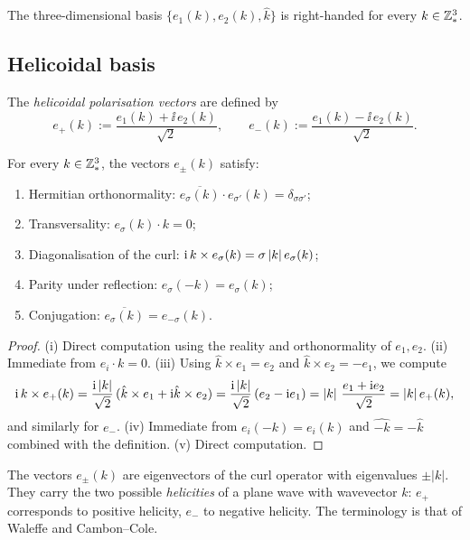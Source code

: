 The three-dimensional basis $\{e_1(k), e_2(k), \hat k\}$ is 
right-handed for every $k\in\mathbb{Z}^3_\ast$.

\subsection{Helicoidal basis}
\label{part-1:ssec:helical}

The \emph{helicoidal polarisation vectors} are defined by
\begin{equation}\label{part-1:eq:helicoidal}
e_+(k) := \frac{e_1(k) + \ii\, e_2(k)}{\sqrt 2},
\qquad
e_-(k) := \frac{e_1(k) - \ii\, e_2(k)}{\sqrt 2}.
\end{equation}

\begin{proposition}
\label{part-1:prop:helical-props}
For every $k\in\mathbb{Z}^3_\ast$, the vectors $e_\pm(k)$ satisfy:
\begin{enumerate}[label=(\roman*),leftmargin=*]
\item Hermitian orthonormality:
      $\overline{e_\sigma(k)}\cdot e_{\sigma'}(k) = \delta_{\sigma\sigma'}$;
\item Transversality: $e_\sigma(k)\cdot k = 0$;
\item Diagonalisation of the curl:
      $\mathrm{i}\, k\times e_\sigma(k) = \sigma\left\lvert k \right\rvert e_\sigma(k)$;
\item Parity under reflection:
      $e_\sigma(-k) = e_\sigma(k)$;
\item Conjugation:
      $\overline{e_\sigma(k)} = e_{-\sigma}(k)$.
\end{enumerate}
\end{proposition}

\begin{proof}
(i) Direct computation using the reality and orthonormality of 
$e_1,e_2$. (ii) Immediate from $e_i\cdot k = 0$. (iii) Using 
$\hat k\times e_1 = e_2$ and $\hat k\times e_2 = -e_1$, we compute
\begin{equation*}
\mathrm{i}\, k\times e_+(k) 
= \frac{\mathrm{i} \left\lvert k \right\rvert}{\sqrt 2}\,(\hat k\times e_1 + \mathrm{i} \hat k\times e_2)
= \frac{\mathrm{i}\left\lvert k \right\rvert}{\sqrt 2}\,(e_2 - \mathrm{i} e_1)
= \left\lvert k \right\rvert\,\frac{e_1 + \mathrm{i} e_2}{\sqrt 2} 
= \left\lvert k \right\rvert e_+(k),
\end{equation*}
and similarly for $e_-$. (iv) Immediate from $e_i(-k) = e_i(k)$ and 
$\hat{-k} = -\hat k$ combined with the definition. (v) Direct computation.
\end{proof}

\begin{remark}\label{part-1:rem:helicity-physical}
The vectors $e_\pm(k)$ are eigenvectors of the curl operator with 
eigenvalues $\pm|k|$. They carry the two possible \emph{helicities} of 
a plane wave with wavevector $k$: $e_+$ corresponds to positive 
helicity, $e_-$ to negative helicity. The terminology is that of 
Waleffe \cite{Waleffe1992} and Cambon--Cole.
\end{remark}

